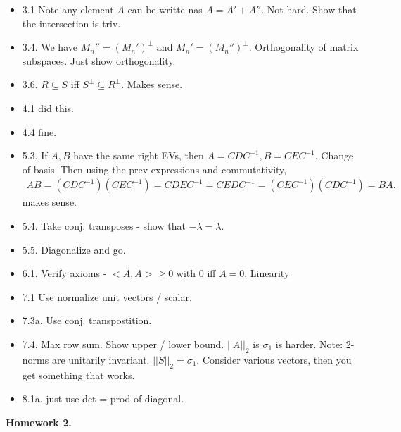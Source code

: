 \documentclass{article}
\begin{document}
\begin{itemize}
  \item 3.1 Note any element $A$ can be writte nas $A = A' + A''$.  Not hard.  Show that the intersection is triv.

  \item 3.4.  We have $M_n'' = (M_n')^{\perp}$ and $M_n' = (M_n'')^{\perp}$.  Orthogonality of matrix subspaces.  Just show orthogonality.
  \item 3.6.  $R \subseteq S$ iff $S^{\perp} \subseteq R^{\perp}$.  Makes sense.
  \item 4.1 did this.
  \item 4.4 fine.
  \item 5.3.  If $A, B$ have the same right EVs, then $A = C D C^{-1}, B = C E C^{-1}$.  Change of basis.  Then using the prev expressions and commutativity,
    \begin{align*}
      AB = (CDC^{-1})(CEC^{-1}) = CDEC^{-1} = CEDC^{-1} =  (C EC ^{-1})(CDC^{-1}) = BA.
    \end{align*}
    makes sense.

  \item 5.4.  Take conj. transposes - show that $- \lambda = \lambda$.
  \item 5.5.  Diagonalize and go.
  \item 6.1.  Verify axioms -  $<A, A> \geq 0$ with $0$ iff $A = 0$.  Linearity
  \item 7.1  Use normalize unit vectors / scalar.
  \item 7.3a.  Use conj. transpostition.
  \item 7.4.  Max row sum.   Show upper / lower bound.
    $||A||_2$ is $\sigma_1$ is harder.  Note: 2-norms are unitarily invariant. $||S||_2 = \sigma_1$.  Consider various vectors, then you get something that works.

  \item 8.1a.  just use det = prod of diagonal.
\end{itemize}

{\bf Homework 2.}
\end{document}

